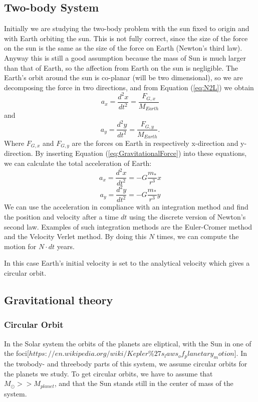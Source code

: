 \documentclass[norsk,a4paper,12pt]{article}
\begin{document}
\subsection{Two-body System}
Initially we are studying the two-body problem with the sun fixed to origin and with Earth orbiting the sun. This is not fully correct, since the size of the force on the sun is the same as the size of the force on Earth (Newton's third law). Anyway this is still a good assumption because the mass of Sun is much larger than that of Earth, so the affection from Earth on the sun is negligible. The Earth's orbit around the sun is co-planar (will be two dimensional), so we are decomposing the force in two directions, and from Equation (\ref{eq:N2L}) we obtain
\begin{equation}
a_x=\frac{d^2x}{dt^2}=\frac{F_{G,x}}{M_{Earth}}
\end{equation}
and
\begin{equation}
a_y=\frac{d^2y}{dt^2}=\frac{F_{G,y}}{M_{Earth}}.
\end{equation}
Where $F_{G,x}$ and $F_{G,y}$ are the forces on Earth in respectively x-direction and y-direction. By inserting Equation (\ref{eq:GravitationalForce}) into these equations, we can calculate the total acceleration of Earth:
\begin{equation}
a_x=\frac{d^2x}{dt^2}=-G\frac{m_*}{r^3}x
\end{equation}
\begin{equation}
a_y=\frac{d^2y}{dt^2}=-G\frac{m_*}{r^3}y
\end{equation}
We can use the acceleration in compliance with an integration method and find the position and velocity after a time $dt$ using the discrete version of Newton's second law. Examples of such integration methods are the Euler-Cromer method and the Velocity Verlet method. By doing this $N$ times, we can compute the motion for $N\cdot dt$ years. 

In this case Earth's initial velocity is set to the analytical velocity which gives a circular orbit.
 
\subsection{Gravitational theory}
\subsubsection{Circular Orbit}
In the Solar system the orbits of the planets are eliptical, with the Sun in one of the foci[$https://en.wikipedia.org/wiki/Kepler\%27s_laws_of_planetary_motion$]. In the twobody- and threebody parts of this system, we assume circular orbits for the planets we study. To get circular orbits, we have to assume that $M_{\odot} >> M_{planet}$, and that the Sun stands still in the center of mass of the system. \par
\vspace{3mm}
\end{document}
